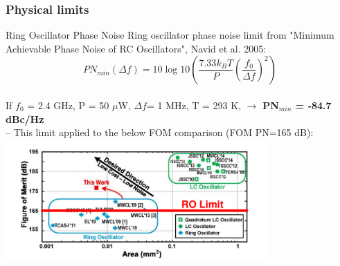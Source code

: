 \documentclass[t, screen, aspectratio=43]{beamer}
\begin{document}

\begin{frame}
	\frametitle{Physical limits}
	\begin{block}{Ring Oscillator Phase Noise}
		\scriptsize
		Ring oscillator phase noise limit from "Minimum Achievable Phase Noise of RC Oscillators", Navid et al. 2005:
		\begin{equation}
			PN_{min}(\Delta f)= 10\log 10\left(\frac{7.33k_BT}{P}\left(\frac{f_0}{\Delta f}\right)^2\right)
		\end{equation}
		\vspace{-.8em}\\
		If $f_0$ = 2.4 GHz, P = 50 $\mu$W, $\Delta f$= 1 MHz, T = 293 K, $\rightarrow$ \textbf{PN$_{min}$ = -84.7 dBc/Hz} \\
		-- This limit applied to the below FOM comparison (FOM PN=165 dB):
		\vspace{-1.5em}
		\center\includegraphics[width=0.75\textwidth, angle=0]{ro_perf.pdf}
	\end{block}
\end{frame}
\end{document}
